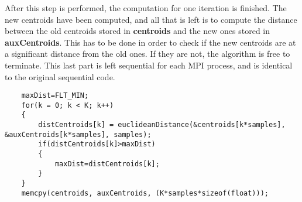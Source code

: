 \documentclass{article}
\begin{document}
After this step is performed, the computation for one iteration is finished. The new centroids have been computed, and all that is left is to compute the distance between the old centroids stored in \textbf{centroids} and the new ones stored in \textbf{auxCentroids}. This has to be done in order to check if the new centroids are at a significant distance from the old ones. If they are not, the algorithm is free to terminate. This last part is left sequential for each MPI process, and is identical to the original sequential code. 
\begin{lstlisting}
    maxDist=FLT_MIN;
    for(k = 0; k < K; k++)
    {
        distCentroids[k] = euclideanDistance(&centroids[k*samples], &auxCentroids[k*samples], samples);
        if(distCentroids[k]>maxDist)
        {
            maxDist=distCentroids[k];
        }
    }
    memcpy(centroids, auxCentroids, (K*samples*sizeof(float)));
\end{lstlisting}
\section*{}
\end{document}
